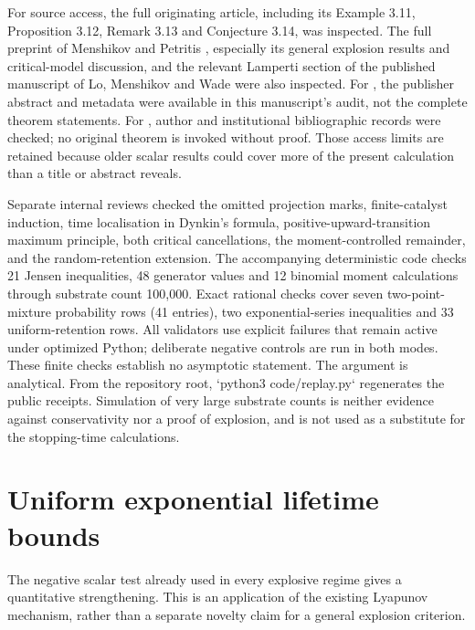 \documentclass[11pt,a4paper]{article}
\theoremstyle{remark}\newtheorem{remark}[theorem]{Remark}
\begin{document}
For source access, the full originating article, including its Example 3.11, Proposition 3.12, Remark 3.13 and Conjecture 3.14, was inspected. The full preprint of Menshikov and Petritis \cite{menshikov2014}, especially its general explosion results and critical-model discussion, and the relevant Lamperti section of the published manuscript of Lo, Menshikov and Wade \cite{lo2024} were also inspected. For \cite{brockwell1982}, the publisher abstract and metadata were available in this manuscript's audit, not the complete theorem statements. For \cite{lamperti1960}, author and institutional bibliographic records were checked; no original theorem is invoked without proof. Those access limits are retained because older scalar results could cover more of the present calculation than a title or abstract reveals.

Separate internal reviews checked the omitted projection marks, finite-catalyst induction, time localisation in Dynkin's formula, positive-upward-transition maximum principle, both critical cancellations, the moment-controlled remainder, and the random-retention extension. The accompanying deterministic code checks 21 Jensen inequalities, 48 generator values and 12 binomial moment calculations through substrate count 100,000. Exact rational checks cover seven two-point-mixture probability rows (41 entries), two exponential-series inequalities and 33 uniform-retention rows. All validators use explicit failures that remain active under optimized Python; deliberate negative controls are run in both modes. These finite checks establish no asymptotic statement. The argument is analytical. From the repository root, `python3 code/replay.py` regenerates the public receipts. Simulation of very large substrate counts is neither evidence against conservativity nor a proof of explosion, and is not used as a substitute for the stopping-time calculations.

\appendix
\section{Uniform exponential lifetime bounds}\label{app:lifetime}

The negative scalar test already used in every explosive regime gives a quantitative strengthening. This is an application of the existing Lyapunov mechanism, rather than a separate novelty claim for a general explosion criterion.
\end{document}
